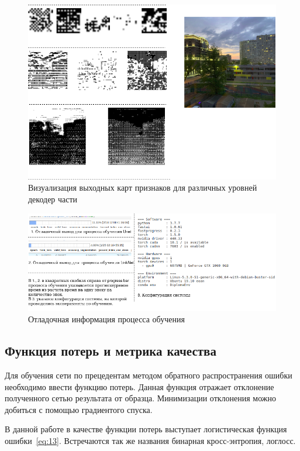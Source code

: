 \begin{figure}[H]
    \centering
    \includegraphics[width=\textwidth]{img/decoder_outputs.png}
    \caption{Визуализация выходных карт признаков для различных уровней декодер части}
    \label{fig:dec_out}
\end{figure}

\begin{figure}[H]
    \centering
    \includegraphics[width=\textwidth]{img/time_debug.png}
    \caption{Отладочная информация процесса обучения}
    \label{fig:time_dbg}
\end{figure}

\subsection{Функция потерь и метрика качества}

Для обучения сети по прецедентам методом обратного распространения ошибки необходимо ввести функцию потерь.
Данная функция отражает отклонение полученного сетью результата от образца.
Минимизации отклонения можно добиться с помощью градиентого спуска.

В данной работе в качестве функции потерь выступает логистическая функция ошибки~\eqref{eq:13}.
Встречаются так же названия бинарная кросс-энтропия, логлосс.

